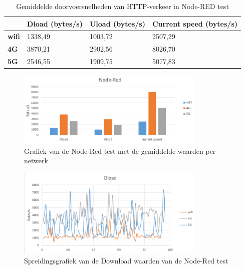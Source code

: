 \begin{table}[h]
    \caption{Gemiddelde doorvoersnelheden van HTTP-verkeer in Node-RED test}
    \label{tab:nodered}
    \begin{tabular}{l l l l}
        \cline{2-4}
        & \textbf{Dload (bytes/s)} & \textbf{Uload (bytes/s)} & \textbf{Current speed (bytes/s)} \\ \hline
        \multicolumn{1}{l}{\textbf{wifi}}       & 1338,49                     & 1003,72                    & 2507,29                             \\ \hline       
        \multicolumn{1}{l}{\textbf{4G}} & 3870,21                     & 2902,56                    & 8026,70                             \\ \hline
        \multicolumn{1}{l}{\textbf{5G}} & 2546,55                     & 1909,75                    & 5077,83                             \\ \hline
    \end{tabular}
    
\end{table}
\begin{figure}
    \includegraphics[width=0.8\textwidth]{../graphics/Node-red_grafiek.png}
    \caption[Grafiek van de Node-Red test met de gemiddelde waarden per netwerk]{\label{fig:noderedgem}Grafiek van de Node-Red test met de gemiddelde waarden per netwerk}
\end{figure}
\begin{figure}

    \includegraphics[width=0.8\textwidth]{../graphics/node-red_dload_grafiek.png}
    \caption[Spreidingsgrafiek van de Download waarden van de Node-Red test]{\label{fig:nodereddload}Spreidingsgrafiek van de Download waarden van de Node-Red test}
\end{figure}
